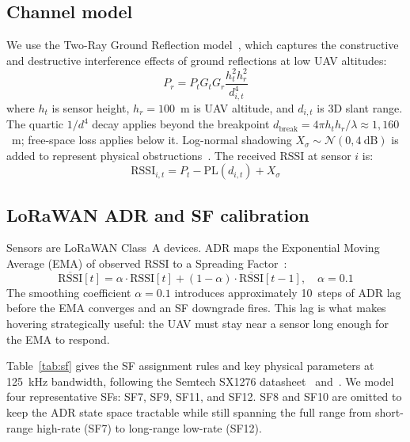 \documentclass[conference]{IEEEtran}
\begin{document}
\subsection{Channel model}

We use the Two-Ray Ground Reflection model~\cite{rappaport2002wireless}, which captures the constructive and destructive interference effects of ground reflections at low UAV altitudes:
\begin{equation}
P_r = P_t G_t G_r \frac{h_t^2 h_r^2}{d_{i,t}^4}
\label{eq:tworay}
\end{equation}
where $h_t$ is sensor height, $h_r{=}100$~m is UAV altitude, and $d_{i,t}$ is 3D slant range. The quartic $1/d^4$ decay applies beyond the breakpoint $d_{\text{break}} = 4\pi h_t h_r / \lambda \approx 1{,}160$~m; free-space loss applies below it. Log-normal shadowing $X_\sigma \sim \mathcal{N}(0,4~\text{dB})$ is added to represent physical obstructions~\cite{alhourani2014optimal}. The received RSSI at sensor $i$ is:
\begin{equation}
\text{RSSI}_{i,t} = P_t - \text{PL}(d_{i,t}) + X_\sigma
\end{equation}

\subsection{LoRaWAN ADR and SF calibration}

Sensors are LoRaWAN Class~A devices. ADR maps the Exponential Moving Average (EMA) of observed RSSI to a Spreading Factor~\cite{slabicki2018adaptive,croce2020lora,augustin2016lora}:
\begin{equation}
\overline{\text{RSSI}}[t] = \alpha \cdot \text{RSSI}[t] + (1 - \alpha) \cdot \overline{\text{RSSI}}[t-1],\quad \alpha{=}0.1
\label{eq:ema}
\end{equation}
The smoothing coefficient $\alpha{=}0.1$ introduces approximately 10~steps of ADR lag before the EMA converges and an SF downgrade fires. This lag is what makes hovering strategically useful: the UAV must stay near a sensor long enough for the EMA to respond.

Table~\ref{tab:sf} gives the SF assignment rules and key physical parameters at 125~kHz bandwidth, following the Semtech SX1276 datasheet~\cite{semtech2020sx1276} and~\cite{croce2020lora}. We model four representative SFs: SF7, SF9, SF11, and SF12. SF8 and SF10 are omitted to keep the ADR state space tractable while still spanning the full range from short-range high-rate (SF7) to long-range low-rate (SF12).
\end{document}
